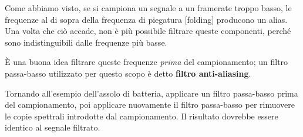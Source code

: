 \documentclass[12pt,a4paper]{book}
\begin{document}
\begin{exercise} Come abbiamo visto, se si campiona un segnale a un framerate troppo basso, le frequenze al di sopra della frequenza di piegatura [folding] producono un alias. Una volta che ciò accade, non è più possibile filtrare queste componenti, perché sono indistinguibili dalle frequenze più basse.

È una buona idea filtrare queste frequenze {\em prima} del campionamento; un filtro passa-basso utilizzato per questo scopo è detto {\bf filtro anti-aliasing}.

Tornando all'esempio dell'assolo di batteria, applicare un filtro passa-basso prima del campionamento, poi applicare nuovamente il filtro passa-basso per rimuovere le copie spettrali introdotte dal campionamento. Il risultato dovrebbe essere identico al segnale filtrato. \end{exercise} 

\backmatter

\printindex
\end{document}
